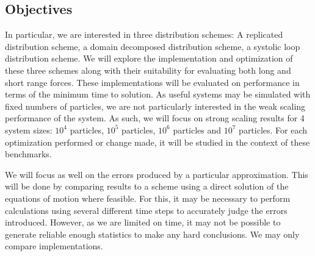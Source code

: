 %
%
\subsection{Objectives}

In particular, we are interested in three distribution schemes:
A replicated distribution scheme,
a domain decomposed distribution scheme,
a systolic loop distribution scheme.
%
We will explore the implementation and optimization of these three schemes
along with their suitability for evaluating both long and short range forces.
%
These implementations will be evaluated on performance in terms of the
minimum time to solution.
%
As useful systems may be simulated with
fixed numbers of particles,
we are not particularly interested in the weak scaling performance of
the system.
%
As such, we will focus on strong scaling results for 4 system sizes:
$10^4$ particles, $10^5$ particles, $10^6$ particles and $10^7$ particles.
%
For each optimization performed or change made, it will be studied
in the context of these benchmarks.

We will focus as well on the errors produced by a particular approximation.
This will be done by comparing results to
a scheme using a direct solution of the equations of motion
where feasible.
%
For this, it may be necessary to perform calculations using several
different time steps to accurately judge the errors introduced.
%
However, as we are limited on time, it may not be possible to generate
reliable enough statistics to make any hard conclusions.
%
We may only compare implementations.
